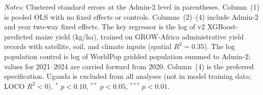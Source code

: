 \par \raggedright 
\textit{Notes:} Clustered standard errors at the Admin-2 level in parentheses. Column~(1) is pooled OLS with no fixed effects or controls. Columns~(2)--(4) include Admin-2 and year two-way fixed effects. The key regressor is the log of v2 XGBoost-predicted maize yield (kg/ha), trained on GROW-Africa administrative yield records with satellite, soil, and climate inputs (spatial $R^2 = 0.35$). The log population control is log of WorldPop gridded population summed to Admin-2; values for 2021--2024 are carried forward from 2020. Column~(4) is the preferred specification. Uganda is excluded from all analyses (not in model training data; LOCO $R^2 < 0$). $^{*}$ $p<0.10$, $^{**}$ $p<0.05$, $^{***}$ $p<0.01$.
\par\endgroup


